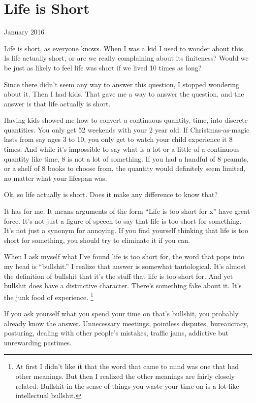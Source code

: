 \chapter{Life is Short}

January 2016

Life is short, as everyone knows. When I was a kid I used to wonder
about this. Is life actually short, or are we really complaining about
its finiteness? Would we be just as likely to feel life was short if we
lived 10 times as long?

Since there didn't seem any way to answer this question, I stopped
wondering about it. Then I had kids. That gave me a way to answer the
question, and the answer is that life actually is short.

Having kids showed me how to convert a continuous quantity, time, into
discrete quantities. You only get 52 weekends with your 2 year old. If
Christmas-as-magic lasts from say ages 3 to 10, you only get to watch
your child experience it 8 times. And while it's impossible to say what
is a lot or a little of a continuous quantity like time, 8 is not a lot
of something. If you had a handful of 8 peanuts, or a shelf of 8 books
to choose from, the quantity would definitely seem limited, no matter
what your lifespan was.

Ok, so life actually is short. Does it make any difference to know that?

It has for me. It means arguments of the form ``Life is too short for
x'' have great force. It's not just a figure of speech to say that life
is too short for something. It's not just a synonym for annoying. If you
find yourself thinking that life is too short for something, you should
try to eliminate it if you can.

When I ask myself what I've found life is too short for, the word that
pops into my head is ``bullshit.'' I realize that answer is somewhat
tautological. It's almost the definition of bullshit that it's the stuff
that life is too short for. And yet bullshit does have a distinctive
character. There's something fake about it. It's the junk food of
experience. \footnote{At first I didn't like it that the word that came to mind was
one that had other meanings. But then I realized the other meanings are
fairly closely related. Bullshit in the sense of things you waste your
time on is a lot like intellectual bullshit.}

If you ask yourself what you spend your time on that's bullshit, you
probably already know the answer. Unnecessary meetings, pointless
disputes, bureaucracy, posturing, dealing with other people's mistakes,
traffic jams, addictive but unrewarding pastimes.

